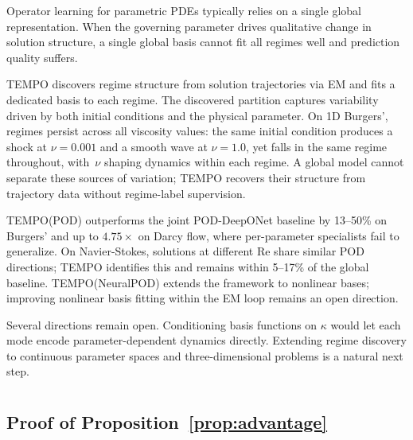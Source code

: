 \documentclass[preprint,10pt]{elsarticle}
\begin{document}
Operator learning for parametric PDEs typically relies on a single global representation.
When the governing parameter drives qualitative change in solution structure, a single global basis cannot fit all regimes well and prediction quality suffers.

TEMPO discovers regime structure from solution trajectories via EM and fits a dedicated basis to each regime.
The discovered partition captures variability driven by both initial conditions and the physical parameter.
On 1D Burgers', regimes persist across all viscosity values: the same initial condition produces a shock at $\nu{=}0.001$ and a smooth wave at $\nu{=}1.0$, yet falls in the same regime throughout, with~$\nu$ shaping dynamics within each regime.
A global model cannot separate these sources of variation; TEMPO recovers their structure from trajectory data without regime-label supervision.

TEMPO(POD) outperforms the joint POD-DeepONet baseline by 13--50\% on Burgers' and up to $4.75\times$ on Darcy flow, where per-parameter specialists fail to generalize.
On Navier-Stokes, solutions at different Re share similar POD directions; TEMPO identifies this and remains within 5--17\% of the global baseline.
TEMPO(NeuralPOD) extends the framework to nonlinear bases; improving nonlinear basis fitting within the EM loop remains an open direction.

Several directions remain open.
Conditioning basis functions on $\kappa$ would let each mode encode parameter-dependent dynamics directly.
Extending regime discovery to continuous parameter spaces and three-dimensional problems is a natural next step.


\clearpage





\newpage
\appendix
\section{}\label{app}

\subsection{Proof of Proposition~\ref{prop:advantage}}\label{app:proof}
\end{document}
